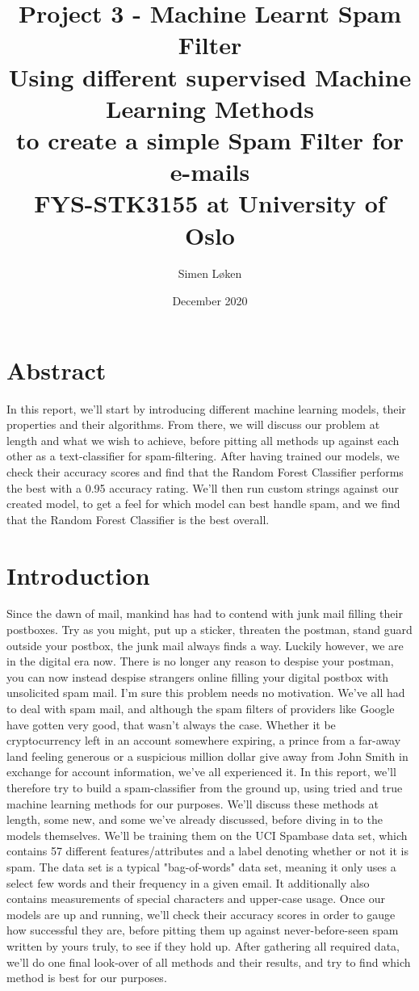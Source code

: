 \documentclass{article}
\title{%
Project 3 - Machine Learnt Spam Filter\\
\Large Using different supervised Machine Learning Methods \\
\Large to create a simple Spam Filter for e-mails \\
\large FYS-STK3155 at University of Oslo}
\author{Simen Løken}
\date{December 2020}
\begin{document}
\nocite{Nb}
\nocite{lecture}
\nocite{svm}

\maketitle
{
  \hypersetup{linkcolor=black}
  \tableofcontents
}
\newpage
\section{Abstract}
In this report, we'll start by introducing different machine learning models, their properties and their algorithms. From there, we will discuss our problem at length and what we wish to achieve, before pitting all methods up against each other as a text-classifier for spam-filtering. After having trained our models, we check their accuracy scores and find that the Random Forest Classifier performs the best with a 0.95 accuracy rating. We'll then run custom strings against our created model, to get a feel for which model can best handle spam, and we find that the Random Forest Classifier is the best overall.
\section{Introduction}
Since the dawn of mail, mankind has had to contend with junk mail filling their postboxes. Try as you might, put up a sticker, threaten the postman, stand guard outside your postbox, the junk mail always finds a way. Luckily however, we are in the digital era now. There is no longer any reason to despise your postman, you can now instead despise strangers online filling your digital postbox with unsolicited spam mail. \newline 
I'm sure this problem needs no motivation. We've all had to deal with spam mail, and although the spam filters of providers like Google have gotten very good, that wasn't always the case. Whether it be cryptocurrency left in an account somewhere expiring, a prince from a far-away land feeling generous or a suspicious million dollar give away from John Smith in exchange for account information, we've all experienced it. \newline
In this report, we'll therefore try to build a spam-classifier from the ground up, using tried and true machine learning methods for our purposes. We'll discuss these methods at length, some new, and some we've already discussed, before diving in to the models themselves. We'll be training them on the UCI Spambase \cite{data} data set, which contains 57 different features/attributes and a label denoting whether or not it is spam. The data set is a typical "bag-of-words" data set, meaning it only uses a select few words and their frequency in a given email. It additionally also contains measurements of special characters and upper-case usage. \newline
Once our models are up and running, we'll check their accuracy scores in order to gauge how successful they are, before pitting them up against never-before-seen spam written by yours truly, to see if they hold up. After gathering all required data, we'll do one final look-over of all methods and their results, and try to find which method is best for our purposes.
\newpage
\end{document}
